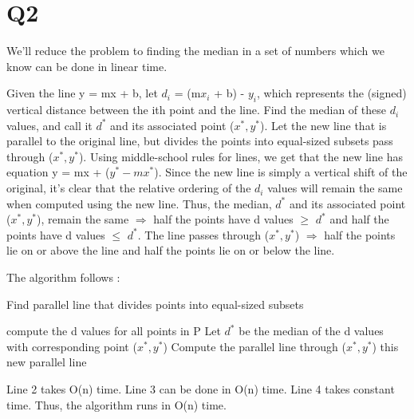 \documentclass[11pt,a4paper]{article}
\begin{document}
\newpage
\section*{Q2}

We'll reduce the problem to finding the median in a set of numbers which we know can be done in linear time. 

Given the line y = mx + b, let $d_{i}$ = (m$x_{i}$ + b) - $y_{i}$, which represents the (signed) vertical distance between the ith point and the line. Find the median of these $d_{i}$ values, and call it $d^{*}$ and its associated point ($x^{*}, y^{*}$). Let the new line that is parallel to the original line, but divides the points into equal-sized subsets pass through ($x^{*}, y^{*}$). Using middle-school rules for lines, we get that the new line has equation y = mx + ($y^{*} - mx^{*}$). Since the new line is simply a vertical shift of the original, it's clear that the relative ordering of the $d_{i}$ values will remain the same when computed using the new line. Thus, the median, $d^{*}$ and its associated point ($x^{*}, y^{*}$), remain the same $\Rightarrow$ half the points have d values $\geq$ $d^{*}$ and half the points have d values $\leq$  $d^{*}$. The line passes through ($x^{*}, y^{*}$) $\Rightarrow$ half the points lie on or above the line and half the points lie on or below the line.

The algorithm follows :

	\begin{algorithm}
	\caption{Find parallel line that divides points into equal-sized subsets}
	\begin{algorithmic}[1]
	\State compute the d values for all points in P
	\State Let $d^{*}$ be the median of the d values with corresponding point ($x^{*}, y^{*}$) 
	\State Compute the parallel line through ($x^{*}, y^{*}$)
	\State \Return this new parallel line 
	\EndFunction
	\end{algorithmic}
	\end{algorithm}
	
	Line 2 takes O(n) time. Line 3 can be done in O(n) time. Line 4 takes constant time. Thus, the algorithm runs in O(n) time.
\end{document}

